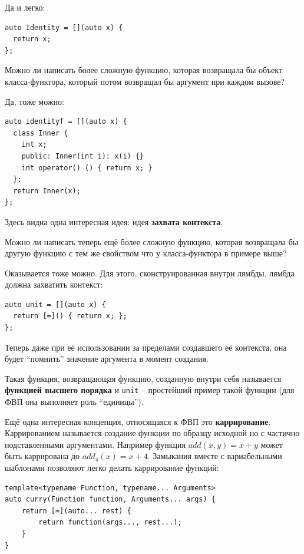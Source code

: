 \documentclass[a4paper,12pt,oneside]{article}
\begin{document}
Да и легко:

\begin{lstlisting}
auto Identity = [](auto x) {
  return x;
};
\end{lstlisting}

Можно ли написать более сложную функцию, которая возвращала бы объект класса-функтора, который потом возвращал бы аргумент при каждом вызове? 

Да, тоже можно:

\begin{lstlisting}
auto identityf = [](auto x) {
  class Inner {
    int x;
    public: Inner(int i): x(i) {}
    int operator() () { return x; }
  };
  return Inner(x);
};
\end{lstlisting}

Здесь видна одна интересная идея: идея \textbf{захвата контекста}. 

Можно ли написать теперь ещё более сложную функцию, которая возвращала бы другую функцию с тем же свойством что у класса-функтора в примере выше? 

Оказывается тоже можно. Для этого, сконструированная внутри лямбды, лямбда должна захватить контекст:

\begin{lstlisting}
auto unit = [](auto x) {
  return [=]() { return x; };
};
\end{lstlisting}

Теперь даже при её использовании за пределами создавшего её контекста, она будет ``помнить'' значение аргумента в момент создания.

Такая функция, возвращающая функцию, созданную внутри себя называется \textbf{функцией высшего порядка} и \lstinline!unit! -- простейший пример такой функции (для ФВП она выполняет роль ``единицы'').

Ещё одна интересная концепция, относящаяся к ФВП это \textbf{каррирование}. Каррированием называется создание функции по образцу исходной но с частично подставленными аргументами. Например функция $add(x,y) = x + y$ может быть каррирована до $add_4(x) = x + 4$. Замыкания вместе с вариабельными шаблонами позволяют легко делать каррирование функций:

\begin{lstlisting}
template<typename Function, typename... Arguments>
auto curry(Function function, Arguments... args) {
    return [=](auto... rest) {
        return function(args..., rest...);
    }
}
\end{lstlisting}
\end{document}
